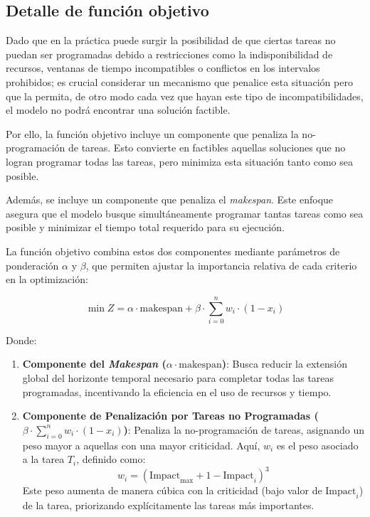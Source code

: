 \documentclass{article}
\begin{document}
\subsection{Detalle de función objetivo}

Dado que en la práctica puede surgir la posibilidad de que ciertas tareas no puedan ser programadas debido a restricciones como la indisponibilidad de recursos, ventanas de tiempo incompatibles o conflictos en los intervalos prohibidos; es crucial considerar un mecanismo que penalice esta situación pero que la permita, de otro modo cada vez que hayan este tipo de incompatibilidades, el modelo no podrá encontrar una solución factible. 

Por ello, la función objetivo incluye un componente que penaliza la no-programación de tareas. Esto convierte en factibles aquellas soluciones que no logran programar todas las tareas, pero minimiza esta situación tanto como sea posible.

Además, se incluye un componente que penaliza el \textit{makespan}. Este enfoque asegura que el modelo busque simultáneamente programar tantas tareas como sea posible y minimizar el tiempo total requerido para su ejecución.

La función objetivo combina estos dos componentes mediante parámetros de ponderación \( \alpha \) y \( \beta \), que permiten ajustar la importancia relativa de cada criterio en la optimización:

\[
\min Z = \alpha \cdot \text{makespan} + \beta \cdot \sum_{i=0}^{n} w_i \cdot (1 - x_i)
\]

Donde:

\begin{enumerate}
    \item \textbf{Componente del \textit{Makespan} (\( \alpha \cdot \text{makespan} \))}: Busca reducir la extensión global del horizonte temporal necesario para completar todas las tareas programadas, incentivando la eficiencia en el uso de recursos y tiempo.

    \item \textbf{Componente de Penalización por Tareas no Programadas (\( \beta \cdot \sum_{i=0}^{n} w_i \cdot (1 - x_i) \))}: Penaliza la no-programación de tareas, asignando un peso mayor a aquellas con una mayor criticidad. Aquí, \( w_i \) es el peso asociado a la tarea \( T_i \), definido como:
    \[
    w_i = (\text{Impact}_{\text{max}} + 1 - \text{Impact}_i)^3
    \]
    Este peso aumenta de manera cúbica con la criticidad (bajo valor de \( \text{Impact}_i \)) de la tarea, priorizando explícitamente las tareas más importantes.
\end{enumerate}
\end{document}
